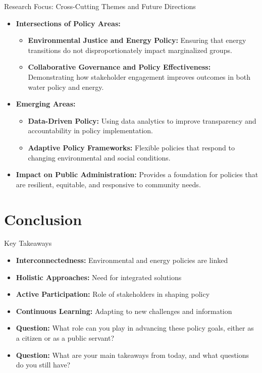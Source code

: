 \documentclass[11pt, aspectratio=169]{beamer}
\begin{document}
\begin{frame}{Research Focus: Cross-Cutting Themes and Future Directions}
    \begin{itemize}
        \item \textbf{Intersections of Policy Areas:}
            \begin{itemize}
                \item \textbf{Environmental Justice and Energy Policy:} Ensuring that energy transitions do not disproportionately impact marginalized groups.
                \item \textbf{Collaborative Governance and Policy Effectiveness:} Demonstrating how stakeholder engagement improves outcomes in both water policy and energy.
            \end{itemize}
        \item \textbf{Emerging Areas:}
            \begin{itemize}
                \item \textbf{Data-Driven Policy:} Using data analytics to improve transparency and accountability in policy implementation.
                \item \textbf{Adaptive Policy Frameworks:} Flexible policies that respond to changing environmental and social conditions.
            \end{itemize}
        \item \textbf{Impact on Public Administration:} Provides a foundation for policies that are resilient, equitable, and responsive to community needs.
    \end{itemize}
\end{frame}

\section{Conclusion}

\begin{frame}{Key Takeaways}
    \begin{itemize}
        \item \textbf{Interconnectedness:} Environmental and energy policies are linked
        \item \textbf{Holistic Approaches:} Need for integrated solutions
        \item \textbf{Active Participation:} Role of stakeholders in shaping policy
        \item \textbf{Continuous Learning:} Adapting to new challenges and information
    \end{itemize}
    \pause
    \begin{itemize}
    \item \textbf{Question:} What role can you play in advancing these policy goals, either as a citizen or as a public servant?
    \end{itemize}
    \pause
    \begin{itemize}
    \item \textbf{Question:} What are your main takeaways from today, and what questions do you still have?
    \end{itemize} 
\end{frame}
\end{document}
